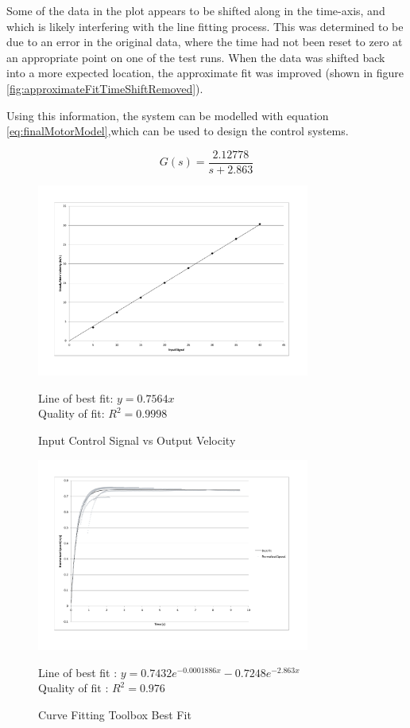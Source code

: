 \documentclass[10pt]{article}
\begin{document}
Some of the data in the plot appears to be shifted along in the time-axis, and
which is likely interfering with the line fitting process. This was determined
to be due to an error in the original data, where the time had not been reset to
zero at an appropriate point on one of the test runs. When the data was shifted
back into a more expected location, the approximate fit was improved (shown in
figure \ref{fig:approximateFitTimeShiftRemoved}).

Using this information, the system can be modelled with equation
\ref{eq:finalMotorModel},which can be used to design the control systems.

\begin{equation}
 \label{eq:finalMotorModel}
 G\left(s\right) = \frac{2.12778}{s+2.863}
\end{equation}

\begin{figure}
 \centering
 \includegraphics[width=0.8\textwidth]{Images/input-signal-vs-output-speed}
 \caption{Input Control Signal vs Output Velocity}
 \label{fig:inputOutputVelocityGraph}

 Line of best fit: $y=0.7564x$ \\
 Quality of fit: $R^2 = 0.9998$
\end{figure}

\begin{figure}
 \centering
 \includegraphics[width=0.8\textwidth]{Images/best-fit-model}
 \caption{Curve Fitting Toolbox Best Fit}
 \label{fig:bestFit}

 Line of best fit : $y=0.7432 e^{-0.0001886x}-0.7248 e^{-2.863x}$ \\
 Quality of fit : $R^2 = 0.976$
\end{figure}
\end{document}
